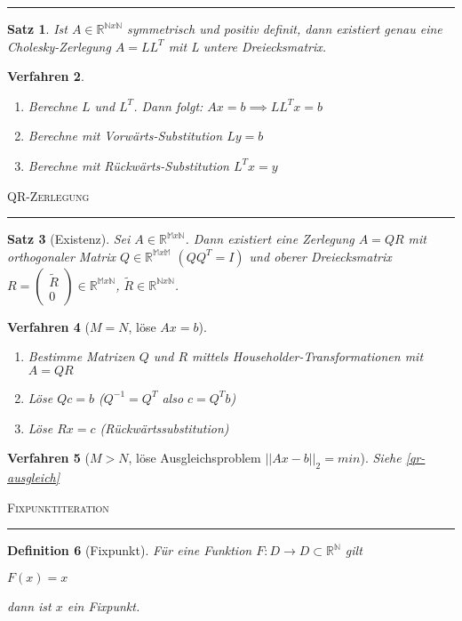 \documentclass[a4paper]{article}
\newcounter{Sec}
\theoremstyle{marginbreak}
\newtheorem{definition}{Definition}[Sec]
\newtheorem{satz}[definition]{Satz}
\newtheorem{verfahren}[definition]{Verfahren}
\newcommand{\sep}{%
	\rule{\textwidth}{0.3pt}%
	\stepcounter{Sec}%
}
\begin{document}
	\sep
	\begin{satz}
		Ist $ A \in \mathbb{R}^{\mathbb{N}x\mathbb{N}}$ symmetrisch und positiv definit, dann existiert genau eine Cholesky-Zerlegung $A=LL^T$ mit L untere Dreiecksmatrix.
	\end{satz}
	\begin{verfahren}
		\begin{enumerate}
			\item Berechne $L$ und $L^T$. Dann folgt: $Ax = b \implies LL^Tx = b $
			\item Berechne mit Vorwärts-Substitution $Ly = b$
			\item Berechne mit Rückwärts-Substitution $L^Tx = y$
		\end{enumerate}
	\end{verfahren}
	\textsc{QR-Zerlegung}
	\sep
	\begin{satz}[Existenz]
		Sei $ A \in \mathbb{R}^{\mathbb{M}x\mathbb{N}}$. Dann existiert eine Zerlegung $A=QR$ mit orthogonaler Matrix $Q \in \mathbb{R}^{\mathbb{M}x\mathbb{M}}$ $(QQ^T=I)$ und oberer Dreiecksmatrix $R=\begin{pmatrix}\widetilde{R} \\ 0\end{pmatrix} \in \mathbb{R}^{\mathbb{M}x\mathbb{N}}$, $\widetilde{R} \in \mathbb{R}^{\mathbb{N}x\mathbb{N}}$.
	\end{satz}
	\begin{verfahren}[$M=N$, löse $Ax=b$]
		\begin{enumerate}
			\item Bestimme Matrizen $Q$ und $R$ mittels Householder-Transformationen mit $A=QR$
			\item Löse $Qc=b$ ($Q^{-1}=Q^T$ also $c = Q^Tb$)
			\item Löse $Rx=c$ (Rückwärtssubstitution)
		\end{enumerate}
	\end{verfahren}
	\begin{verfahren}[$M>N$, löse Ausgleichsproblem $||Ax-b||_2=min$]
		Siehe \ref{qr-ausgleich}
	\end{verfahren}
	\textsc{Fixpunktiteration}
	\sep
	\begin{definition}[Fixpunkt]
		Für eine Funktion $F : D \to D \subset \mathbb{R}^\mathbb{N}$ gilt
		\begin{description}
			\item $F(x) = x$
		\end{description}
		dann ist $x$ ein Fixpunkt.
	\end{definition}
\end{document}
